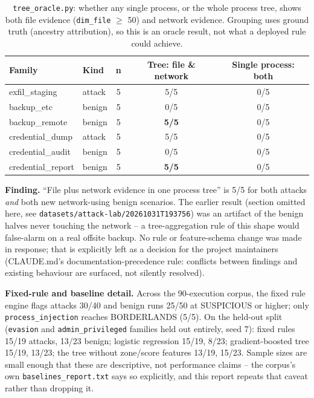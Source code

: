 \documentclass[11pt,a4paper]{article}
\begin{document}
\begin{table}[h]
\centering
\small
\begin{tabular}{@{}l l c c c@{}}
\toprule
\textbf{Family} & \textbf{Kind} & \textbf{n} & \textbf{Tree: file \& network} & \textbf{Single process: both} \\
\midrule
exfil\_staging      & attack & 5 & 5/5 & 0/5 \\
backup\_etc         & benign & 5 & 0/5 & 0/5 \\
backup\_remote      & benign & 5 & \textbf{5/5} & 0/5 \\
\addlinespace
credential\_dump    & attack & 5 & 5/5 & 0/5 \\
credential\_audit   & benign & 5 & 0/5 & 0/5 \\
credential\_report  & benign & 5 & \textbf{5/5} & 0/5 \\
\bottomrule
\end{tabular}
\caption{\texttt{tree\_oracle.py}: whether any single process, or the
whole process tree, shows both file evidence (\texttt{dim\_file} $\geq$ 50)
and network evidence. Grouping uses ground truth (ancestry attribution),
so this is an oracle result, not what a deployed rule could achieve.}
\end{table}

\textbf{Finding.} ``File plus network evidence in one process tree'' is
5/5 for both attacks \emph{and} both new network-using benign scenarios.
The earlier result (section omitted here, see
\texttt{datasets/attack-lab/20261031T193756}) was an artifact of the
benign halves never touching the network -- a tree-aggregation rule of
this shape would false-alarm on a real offsite backup. No rule or
feature-schema change was made in response; that is explicitly left as a
decision for the project maintainers (CLAUDE.md's documentation-precedence
rule: conflicts between findings and existing behaviour are surfaced, not
silently resolved).

\textbf{Fixed-rule and baseline detail.} Across the 90-execution corpus,
the fixed rule engine flags attacks 30/40 and benign runs 25/50 at
SUSPICIOUS or higher; only \texttt{process\_injection} reaches
BORDERLANDS (5/5). On the held-out split (\texttt{evasion} and
\texttt{admin\_privileged} families held out entirely, seed 7): fixed
rules 15/19 attacks, 13/23 benign; logistic regression 15/19, 8/23;
gradient-boosted tree 15/19, 13/23; the tree without zone/score features
13/19, 15/23. Sample sizes are small enough that these are descriptive,
not performance claims -- the corpus's own \texttt{baselines\_report.txt}
says so explicitly, and this report repeats that caveat rather than
dropping it.
\end{document}
